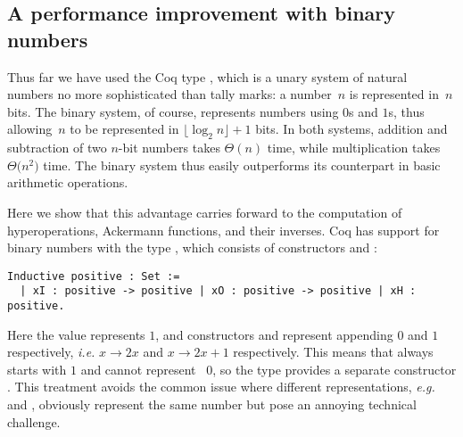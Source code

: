 
\subsection{A performance improvement with binary numbers}
Thus far we have used the Coq type , which is a unary system of 
natural numbers no more sophisticated than tally marks: 
a number~$n$ is represented in~$n$ bits. 
The binary system, of course, represents numbers using $0$s and $1$s, thus 
allowing~$n$ to be represented in $\lfloor \log_{2} n \rfloor + 1$ bits.
In both systems, addition and subtraction of two $n$-bit numbers takes $\Theta(n)$ time, 
while multiplication takes $\Theta \big(n^2\big)$ time. 
The binary system thus easily outperforms its counterpart in basic arithmetic operations. 

Here we show that this advantage carries forward to the computation of 
hyperoperations, Ackermann functions, and their inverses. 
Coq has support for binary numbers with the type , which consists 
of constructors  and :
\begin{lstlisting}
Inductive positive : Set := 
  | xI : positive -> positive | xO : positive -> positive | xH : positive.
\end{lstlisting}
Here the value  represents $1$, and constructors  and  represent 
appending $0$ and $1$ respectively, \emph{i.e.} $x\to 2x$ and $x\to 2x+1$ respectively. 
This means that  always starts with $1$ and cannot represent ~$0$, so
the type  provides a separate constructor . 
This treatment avoids the common issue where different representations,  
\emph{e.g.}  and , obviously represent the same number but pose
an annoying technical challenge. 



